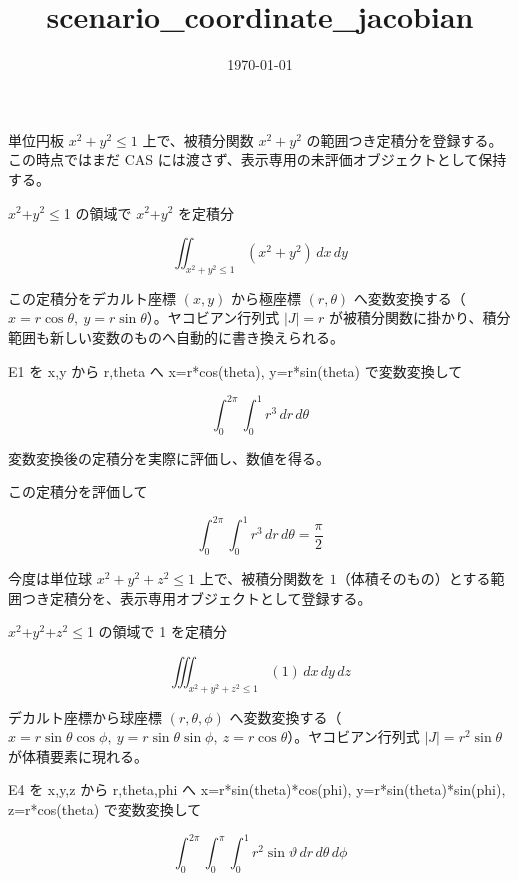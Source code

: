 \documentclass[dvipdfmx,a4paper,11pt]{jsarticle}
\title{scenario\_coordinate\_jacobian}
\date{\today}
\begin{document}
\maketitle

単位円板 $x^2+y^2\le1$ 上で、被積分関数 $x^2+y^2$ の範囲つき定積分を登録する。この時点ではまだ CAS には渡さず、表示専用の未評価オブジェクトとして保持する。

$x^2$+$y^2$$\le$1 の領域で $x^2$+$y^2$ を定積分

\begin{equation}
  \iint_{x^2+y^2 \le 1} (x^2+y^2) \, dx \, dy
  \label{eq:E1}
\end{equation}

この定積分をデカルト座標 $(x,y)$ から極座標 $(r,\theta)$ へ変数変換する（$x=r\cos\theta,\ y=r\sin\theta$）。ヤコビアン行列式 $|J|=r$ が被積分関数に掛かり、積分範囲も新しい変数のものへ自動的に書き換えられる。

E1 を x,y から r,theta へ x=r*cos(theta), y=r*sin(theta) で変数変換して

\begin{equation}
  \int_{0}^{2\pi} \int_{0}^{1} r^3 \, dr \, d\theta
  \label{eq:E2}
\end{equation}

変数変換後の定積分を実際に評価し、数値を得る。

この定積分を評価して

\begin{equation}
  \int_{0}^{2\pi} \int_{0}^{1} r^3 \, dr \, d\theta = \frac{\pi}{2}
  \label{eq:E3}
\end{equation}

今度は単位球 $x^2+y^2+z^2\le1$ 上で、被積分関数を $1$（体積そのもの）とする範囲つき定積分を、表示専用オブジェクトとして登録する。

$x^2$+$y^2$+$z^2$$\le$1 の領域で 1 を定積分

\begin{equation}
  \iiint_{x^2+y^2+z^2 \le 1} (1) \, dx \, dy \, dz
  \label{eq:E4}
\end{equation}

デカルト座標から球座標 $(r,\theta,\phi)$ へ変数変換する（$x=r\sin\theta\cos\phi,\ y=r\sin\theta\sin\phi,\ z=r\cos\theta$）。ヤコビアン行列式 $|J|=r^2\sin\theta$ が体積要素に現れる。

E4 を x,y,z から r,theta,phi へ x=r*sin(theta)*cos(phi), y=r*sin(theta)*sin(phi), z=r*cos(theta) で変数変換して

\begin{equation}
  \int_{0}^{2\pi} \int_{0}^{\pi} \int_{0}^{1} r^2 \sin \vartheta \, dr \, d\theta \, d\phi
  \label{eq:E5}
\end{equation}
\end{document}

